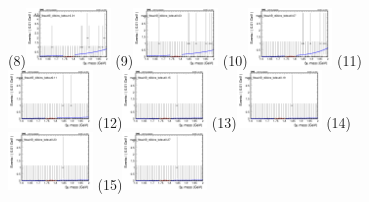 \begin{figure}[h!]
        \subfigure(8){\includegraphics[width=0.2\textwidth]{unfixed_exp/plots/tauhB/massfit_tauhB_40bins_bdtcut-0.01.png}}
        \subfigure(9){\includegraphics[width=0.2\textwidth]{unfixed_exp/plots/tauhB/massfit_tauhB_40bins_bdtcut0.03.png}}
        \subfigure(10){\includegraphics[width=0.2\textwidth]{unfixed_exp/plots/tauhB/massfit_tauhB_40bins_bdtcut0.07.png}}
        \subfigure(11){\includegraphics[width=0.2\textwidth]{unfixed_exp/plots/tauhB/massfit_tauhB_40bins_bdtcut0.11.png}}
        \subfigure(12){\includegraphics[width=0.2\textwidth]{unfixed_exp/plots/tauhB/massfit_tauhB_40bins_bdtcut0.15.png}}
        \subfigure(13){\includegraphics[width=0.2\textwidth]{unfixed_exp/plots/tauhB/massfit_tauhB_40bins_bdtcut0.19.png}}
        \subfigure(14){\includegraphics[width=0.2\textwidth]{unfixed_exp/plots/tauhB/massfit_tauhB_40bins_bdtcut0.23.png}}
        \subfigure(15){\includegraphics[width=0.2\textwidth]{unfixed_exp/plots/tauhB/massfit_tauhB_40bins_bdtcut0.27.png}}

\end{figure}
